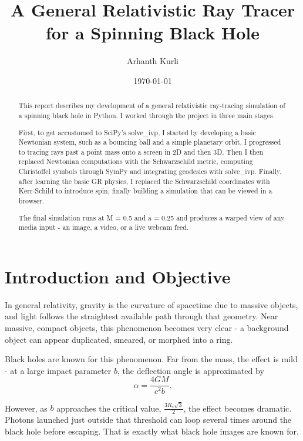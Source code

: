 \documentclass[11pt,a4paper]{article}
\title{\textbf{A General Relativistic Ray Tracer for a Spinning Black Hole}}
\author{Arhanth Kurli}
\date{\today}
\begin{document}
\maketitle

\begin{abstract}
This report describes my development of a general relativistic ray-tracing simulation of a spinning black hole in Python. I worked through the project in three main stages.

First, to get accustomed to SciPy's solve\_ivp, I started by developing a basic Newtonian system, such as a bouncing ball and a simple planetary orbit. I progressed to tracing rays past a point mass onto a screen in 2D and then 3D. Then I then replaced Newtonian computations with the Schwarzschild metric, computing Christoffel symbols through SymPy and integrating geodesics with solve\_ivp. Finally, after learning the basic GR physics, I replaced the Schwarzschild coordinates with Kerr-Schild to introduce spin, finally building a simulation that can be viewed in a browser.

The final simulation runs at M = 0.5 and a = 0.25 and produces a warped view of any media input - an image, a video, or a live webcam feed.

\end{abstract}

\tableofcontents   %
\newpage

\section{Introduction and Objective}
\label{sec:intro}

In general relativity, gravity is the curvature of spacetime due to massive objects, and light follows the straightest available path through that geometry. Near massive, compact objects, this phenomenon becomes very clear - a background object can appear duplicated, smeared, or morphed into a ring.

Black holes are known for this phenomenon. Far from the mass, the effect is mild - at a large impact parameter $b$, the deflection angle is approximated by
$$\alpha = \frac{4GM}{c^2b}.$$

However, as $b$ approaches the critical value, $\frac{3R_s\sqrt{3}}{2}$, the effect becomes dramatic. Photons launched just outside that threshold can loop several times around the black hole before escaping. That is exactly what black hole images are known for.
\end{document}
